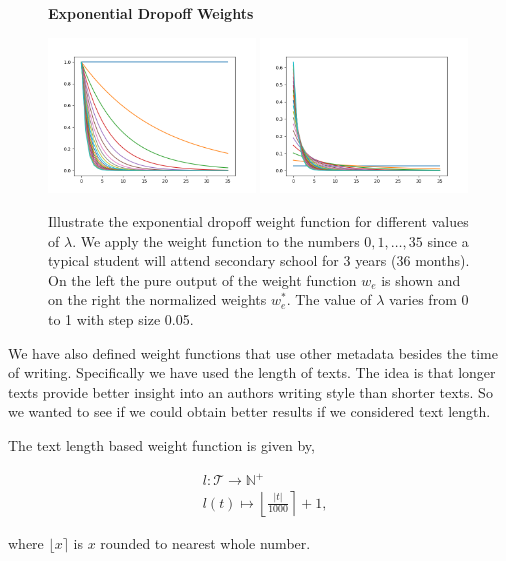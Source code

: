 \begin{figure}
    \centering
    \textbf{Exponential Dropoff Weights}\par\medskip
    \includegraphics[width=0.49\textwidth]{./pictures/method/weights.png}
    \includegraphics[width=0.49\textwidth]{./pictures/method/weights_normalized.png}
    \caption{Illustrate the exponential dropoff weight function for different
    values of $\lambda$. We apply the weight function to the numbers $0, 1,
    \dots, 35$ since a typical student will attend secondary school for 3 years
    (36 months). On the left the pure output of the weight function $w_e$ is
    shown and on the right the normalized weights $w_e^*$. The value of
    $\lambda$ varies from 0 to 1 with step size 0.05.}
    \label{fig:weights}
\end{figure}

We have also defined weight functions that use other metadata besides the time
of writing. Specifically we have used the length of texts. The idea is that
longer texts provide better insight into an authors writing style than shorter
texts. So we wanted to see if we could obtain better results if we considered
text length.

\begin{definition}

    The text length based weight function is given by,

    \begin{align}
        &l \colon \mathcal{T} \rightarrow \mathbb{N}^+ \\
        &l(t) \mapsto \left\lfloor \frac{|t|}{1000} \right\rceil + 1,
    \end{align}

    where $\lfloor x \rceil$ is $x$ rounded to nearest whole number.

\end{definition}

